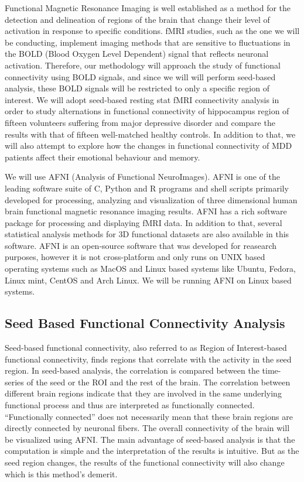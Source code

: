 ﻿\documentclass[12pt]{article}
\begin{document}
Functional Magnetic Resonance Imaging is well established as a method
for the detection and delineation of regions of the brain that change
their level of activation in response to specific conditions. fMRI
studies, such as the one we will be conducting, implement imaging
methods that are sensitive to fluctuations in the BOLD (Blood Oxygen
Level Dependent) signal that reflects neuronal activation.  Therefore,
our methodology will approach the study of functional connectivity
using BOLD signals, and since we will will perform seed-based
analysis, these BOLD signals will be restricted to only a specific
region of interest. We will adopt seed-based resting stat fMRI
connectivity analysis in order to study alternations in functional
connectivity of hippocampus region of fifteen volunteers suffering
from major depressive disorder and compare the results with that of
fifteen well-matched healthy controls. In addition to that, we will
also attempt to explore how the changes in functional connectivity of
MDD patients affect their emotional behaviour and memory.

We will use AFNI (Analysis of Functional NeuroImages). AFNI is one of
the leading software suite of C, Python and R programs and shell
scripts primarily developed for processing, analyzing and
visualization of three dimensional human brain functional magnetic
resonance imaging results. AFNI has a rich software package for
processing and displaying fMRI data. In addition to that, several
statistical analysis methods for 3D functional datasets are also
available in this software. AFNI is an open-source software that was
developed for reasearch purposes, however it is not cross-platform and
only runs on UNIX based operating systems such as MacOS and Linux
based systems like Ubuntu, Fedora, Linux mint, CentOS and Arch
Linux. We will be running AFNI on Linux based systems.

\subsection{Seed Based Functional Connectivity Analysis}

Seed-based functional connectivity, also referred to as Region of
Interest-based functional connectivity, finds regions that correlate
with the activity in the seed region. In seed-based analysis, the
correlation is compared between the time-series of the seed or the ROI
and the rest of the brain. The correlation between different brain
regions indicate that they are involved in the same underlying
functional process and thus are interpreted as functionally
connected. ``Functionally connected'' does not necessarily mean that
these brain regions are directly connected by neuronal fibers. The
overall connectivity of the brain will be visualized using AFNI. The
main advantage of seed-based analysis is that the computation is
simple and the interpretation of the results is intuitive. But as the
seed region changes, the results of the functional connectivity will
also change which is this method's demerit.
\end{document}
